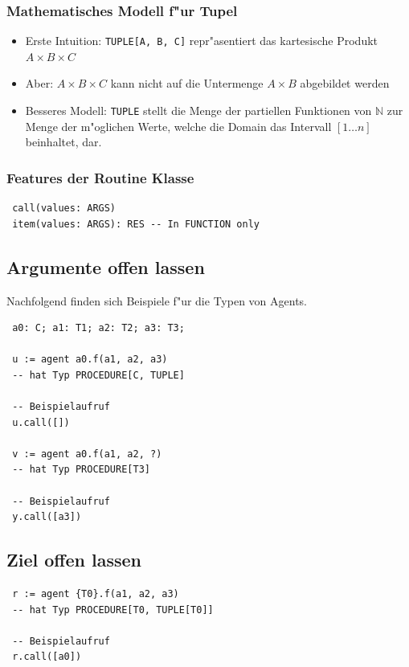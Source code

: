 \documentclass[german, 10pt, a4paper, twocolumn]{scrartcl}
\theoremstyle{definition}
\begin{document}
\subsubsection{Mathematisches Modell f"ur Tupel}

\begin{itemize}
	\item Erste Intuition: \verb#TUPLE[A, B, C]# repr"asentiert das kartesische Produkt $A \times B \times C$
	\item Aber: $A \times B \times C$ kann nicht auf die Untermenge $A \times B$ abgebildet werden
	\item Besseres Modell: \verb#TUPLE# stellt die Menge der partiellen Funktionen von $\mathbb{N}$ zur Menge der m"oglichen Werte, welche die Domain das Intervall $[1  \ldots n]$ beinhaltet, dar.
\end{itemize}

\subsubsection{Features der Routine Klasse}

\begin{verbatim}
 call(values: ARGS)
 item(values: ARGS): RES -- In FUNCTION only
\end{verbatim}

\subsection{Argumente offen lassen}

Nachfolgend finden sich Beispiele f"ur die Typen von Agents.

\begin{verbatim}
 a0: C; a1: T1; a2: T2; a3: T3;
 
 u := agent a0.f(a1, a2, a3) 
 -- hat Typ PROCEDURE[C, TUPLE]

 -- Beispielaufruf
 u.call([])

 v := agent a0.f(a1, a2, ?)
 -- hat Typ PROCEDURE[T3]

 -- Beispielaufruf
 y.call([a3])
\end{verbatim}

\subsection{Ziel offen lassen}

\begin{verbatim}
 r := agent {T0}.f(a1, a2, a3)
 -- hat Typ PROCEDURE[T0, TUPLE[T0]]

 -- Beispielaufruf
 r.call([a0])
\end{verbatim}
\end{document}
